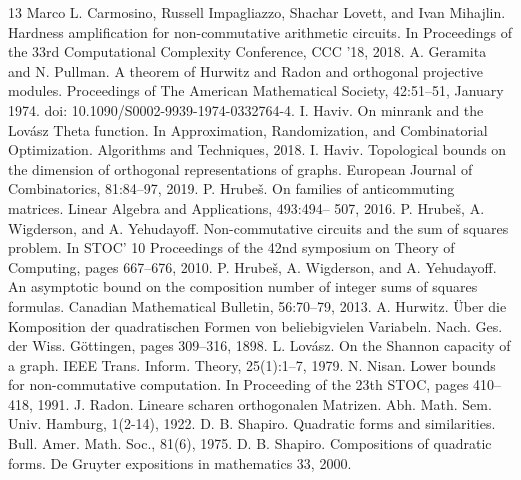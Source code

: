 \begin{thebibliography}{13}
 Marco L. Carmosino, Russell Impagliazzo, Shachar Lovett, and Ivan Mihajlin. Hardness amplification for non-commutative arithmetic circuits. In Proceedings of the 33rd Computational Complexity Conference, CCC ’18, 2018.
 A. Geramita and N. Pullman. A theorem of Hurwitz and Radon and orthogonal projective modules. Proceedings of The American Mathematical Society, 42:51–51, January 1974. doi: 10.1090/S0002-9939-1974-0332764-4.
 I. Haviv. On minrank and the Lovász Theta function. In Approximation, Randomization, and Combinatorial Optimization. Algorithms and Techniques, 2018.
 I. Haviv. Topological bounds on the dimension of orthogonal representations of graphs. European Journal of Combinatorics, 81:84–97, 2019.
 P. Hrubeš. On families of anticommuting matrices. Linear Algebra and Applications, 493:494– 507, 2016.
 P. Hrubeš, A. Wigderson, and A. Yehudayoff. Non-commutative circuits and the sum of squares problem. In STOC’ 10 Proceedings of the 42nd symposium on Theory of Computing, pages 667–676, 2010.
 P. Hrubeš, A. Wigderson, and A. Yehudayoff. An asymptotic bound on the composition number of integer sums of squares formulas. Canadian Mathematical Bulletin, 56:70–79, 2013.
 A. Hurwitz. Über die Komposition der quadratischen Formen von beliebigvielen Variabeln. Nach. Ges. der Wiss. Göttingen, pages 309–316, 1898.
 L. Lovász. On the Shannon capacity of a graph. IEEE Trans. Inform. Theory, 25(1):1–7, 1979.
 N. Nisan. Lower bounds for non-commutative computation. In Proceeding of the 23th STOC, pages 410–418, 1991.
 J. Radon. Lineare scharen orthogonalen Matrizen. Abh. Math. Sem. Univ. Hamburg, 1(2-14), 1922.
 D. B. Shapiro. Quadratic forms and similarities. Bull. Amer. Math. Soc., 81(6), 1975.
 D. B. Shapiro. Compositions of quadratic forms. De Gruyter expositions in mathematics 33, 2000.
\end{thebibliography}
